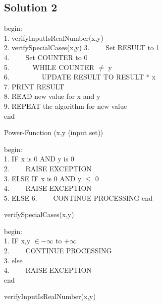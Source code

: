 \documentclass[a4paper,12pt]{article}
\begin{document}
\subsection{Solution 2}
\begin{algorithm}[H]
	begin: \\
	1. verifyInputIsRealNumber(x,y)\\
	2. verifySpecialCases(x,y)
	3. $\hspace{2em}$Set RESULT to 1 \\
	4. $\hspace{2em}$Set COUNTER to 0\\
	5. $\hspace{3em}$WHILE COUNTER $\neq$ y \\
	6. $\hspace{4em}$ UPDATE RESULT TO RESULT * x\\
	7. PRINT RESULT \\
	8. READ new value for x and y\\
	9. REPEAT the algorithm for new value \\
	end
	\caption{Power-Function (x,y (input set))}
\end{algorithm}

\vspace{0.5cm}

\begin{algorithm}
	begin:\\
	1. IF x is 0 AND y is 0 \\
	2. $\hspace{2em}$RAISE EXCEPTION \\
	3. ELSE IF x is 0 AND y $\le$ 0 \\
	4. $\hspace{2em}$RAISE EXCEPTION \\
	5. ELSE
	6. $\hspace{2em}$CONTINUE PROCESSING 
	end
	\caption{verifySpecialCases(x,y)}
\end{algorithm}

\begin{algorithm}
	begin:\\
	1. IF  x,y $\in -\infty$  to  +$\infty$ \\
	2. $\hspace{2em}$CONTINUE PROCESSING\\
	3. else\\
	4. $\hspace{2em}$RAISE EXCEPTION \\
	end
	\caption{verifyInputIsRealNumber(x,y)}
\end{algorithm}
\end{document}
